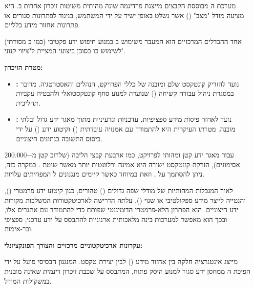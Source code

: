 
מערכת ה מבוססת הקבצים מייצגת פרדיגמה שונה מהותית משיטות זיכרון אחרות ב. היא מציעה מודל "מצב" () אשר נשלט באופן ישיר על ידי המשתמש, בניגוד לפתרונות סגורים או פתרונות אחזור מידע כלליים.


אחד ההבדלים המרכזיים הוא המעבר משימוש ב כמנוע חיפוש ידע פקטיבי (כמו ב מסורתי) לשימוש בו כסוכן ביצועי המציית ל"ציווי קנוני".

\textbf{מטרת הזיכרון:}
\begin{itemize}
  \item \textbf{:} נועד להזריק קונטקסט שלם ומובנה של כללי הפרויקט, הנהלים והאסטרטגיה. מדובר במסגרת ניהול עבודה קשיחה () שנועדה למנוע סחף קונטקסטואלי ולהבטיח עקביות תהליכית.
  \item \textbf{:} נועד לאחזר פיסות מידע ספציפיות, עדכניות וגרעיניות מתוך מאגר ידע גדול ובלתי מובנה. מטרתו העיקרית היא להתמודד עם אמנזיה עובדתית () וקיטוע ידע () על ידי ביסוס התשובה בנתונים חיצוניים.
\end{itemize}

עבור מאגר ידע קטן ומהותי לפרויקט, כמו ארבעת קבצי הליבה (שלרוב קטן מ\num{-200,000} אסימונים), הזרקת קונטקסט ישירה היא אמינה ורלוונטית יותר מאשר שיטת . במקרה כזה, ניתן להסתמך על , וזאת במיוחד כאשר קיימים מנגנונים ל המפחיתים עלויות.


לאור המגבלות המהותיות של מודלי שפה גדולים () טהורים, כגון קיטוע ידע פרמטרי (), והנטייה לייצר מידע ספקולטיבי או שגוי (), עלתה הדרישה לארכיטקטורות המשלבות מקורות ידע חיצוניים.  הוא הפתרון הלא-פרמטרי הדומיננטי שפותח כדי להתמודד עם אתגרים אלו, ובכך הוא מאפשר למערכות בינה מלאכותית ארגוניות להתבסס על ידע עדכני, ספציפי ובר-אימות.

\textbf{עקרונות ארכיטקטוניים מרכזיים והצורך הפונקציונלי:}

 מייצג אינטגרציה חלקה בין אחזור מידע () לבין יצירת טקסט. המנגנון הבסיסי פועל על ידי הפיכת ה ממחסן ידע סגור למנוע היסק פתוח, המתבסס על שכבת זיכרון דינמית שאינה מובנית במשקולות המודל.

